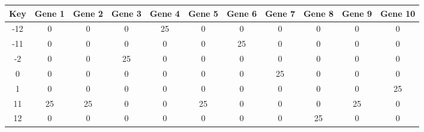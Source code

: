 \begin{tabular}{|c|c|c|c|c|c|c|c|c|c|c|}
\hline
Key & Gene 1 & Gene 2 & Gene 3 & Gene 4 & Gene 5 & Gene 6 & Gene 7 & Gene 8 & Gene 9 & Gene 10 \\
\hline
-12 & 0 & 0 & 0 & 25 & 0 & 0 & 0 & 0 & 0 & 0 \\
-11 & 0 & 0 & 0 & 0 & 0 & 25 & 0 & 0 & 0 & 0 \\
-2 & 0 & 0 & 25 & 0 & 0 & 0 & 0 & 0 & 0 & 0 \\
0 & 0 & 0 & 0 & 0 & 0 & 0 & 25 & 0 & 0 & 0 \\
1 & 0 & 0 & 0 & 0 & 0 & 0 & 0 & 0 & 0 & 25 \\
11 & 25 & 25 & 0 & 0 & 25 & 0 & 0 & 0 & 25 & 0 \\
12 & 0 & 0 & 0 & 0 & 0 & 0 & 0 & 25 & 0 & 0 \\
\hline
\end{tabular}